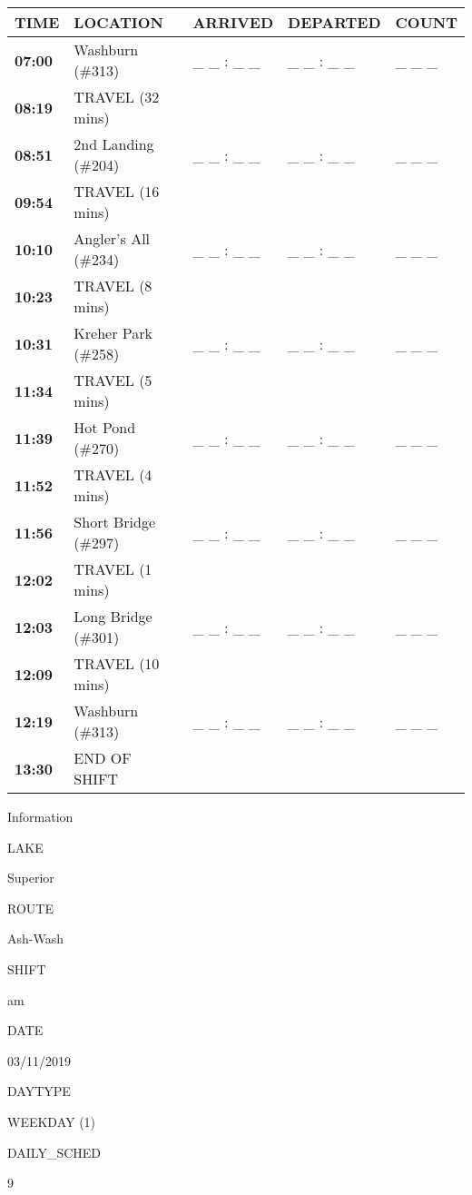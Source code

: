 \documentclass[]{article}
\begin{document}
\begin{tabular}{>{\bfseries}lllll}
\toprule
\textbf{TIME} & \textbf{LOCATION} & \textbf{ARRIVED} & \textbf{DEPARTED} & \textbf{COUNT}\\
\midrule
07:00 & Washburn (\#313) & \_ \_ : \_ \_ & \_ \_ : \_ \_ & \_ \_ \_\\
08:19 & TRAVEL (32 mins) &  &  & \\
08:51 & 2nd Landing (\#204) & \_ \_ : \_ \_ & \_ \_ : \_ \_ & \_ \_ \_\\
09:54 & TRAVEL (16 mins) &  &  & \\
10:10 & Angler's All (\#234) & \_ \_ : \_ \_ & \_ \_ : \_ \_ & \_ \_ \_\\
10:23 & TRAVEL (8 mins) &  &  & \\
10:31 & Kreher Park (\#258) & \_ \_ : \_ \_ & \_ \_ : \_ \_ & \_ \_ \_\\
11:34 & TRAVEL (5 mins) &  &  & \\
11:39 & Hot Pond (\#270) & \_ \_ : \_ \_ & \_ \_ : \_ \_ & \_ \_ \_\\
11:52 & TRAVEL (4 mins) &  &  & \\
11:56 & Short Bridge (\#297) & \_ \_ : \_ \_ & \_ \_ : \_ \_ & \_ \_ \_\\
12:02 & TRAVEL (1 mins) &  &  & \\
12:03 & Long Bridge (\#301) & \_ \_ : \_ \_ & \_ \_ : \_ \_ & \_ \_ \_\\
12:09 & TRAVEL (10 mins) &  &  & \\
12:19 & Washburn (\#313) & \_ \_ : \_ \_ & \_ \_ : \_ \_ & \_ \_ \_\\
13:30 & END OF SHIFT &  &  & \\
\bottomrule
\end{tabular}\newpage

Information

LAKE

Superior

ROUTE

Ash-Wash

SHIFT

am

DATE

03/11/2019

DAYTYPE

WEEKDAY (1)

DAILY\_SCHED

9

\vspace{24pt}
\end{document}
